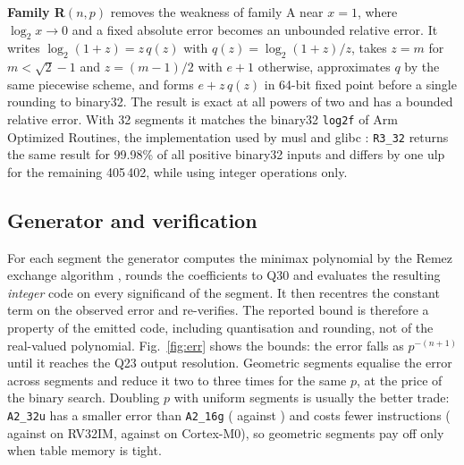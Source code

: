 \documentclass[preprint,12pt]{elsarticle}
\begin{document}
\textbf{Family R$(n,p)$} removes the weakness of family A near $x=1$, where
$\log_2 x \to 0$ and a fixed absolute error becomes an unbounded relative
error. It writes $\log_2(1+z) = z\,q(z)$ with $q(z)=\log_2(1+z)/z$, takes
$z=m$ for $m<\sqrt2-1$ and $z=(m-1)/2$ with $e+1$ otherwise, approximates
$q$ by the same piecewise scheme, and forms $e+z\,q(z)$ in 64-bit fixed point
before a single rounding to binary32. The result is exact at all powers of two
and has a bounded relative error. With 32 segments it matches the binary32
\texttt{log2f} of Arm Optimized Routines, the implementation used by musl and
glibc \cite{aor}: \texttt{R3\_32} returns the same result for 99.98\% of all
positive binary32 inputs and differs by one ulp for the remaining 405\,402,
while using integer operations only.

\subsection{Generator and verification}

For each segment the generator computes the minimax polynomial by the Remez
exchange algorithm \cite{muller2016}, rounds the coefficients to Q30 and
evaluates the resulting \emph{integer} code on every significand of the
segment. It then recentres the constant term on the observed error and
re-verifies. The reported bound is therefore a property of the emitted code,
including quantisation and rounding, not of the real-valued polynomial.
Fig.~\ref{fig:err} shows the bounds: the error falls as $p^{-(n+1)}$ until it
reaches the Q23 output resolution. Geometric segments equalise the error
across segments and reduce it two to three times for the same $p$, at the
price of the binary search. Doubling $p$ with uniform segments is usually the
better trade: \texttt{A2\_32u} has a smaller error than \texttt{A2\_16g}
(\numeAtwou{} against \numeAsixg) and costs fewer instructions
(\numiAtwou{} against \numiAsixg{} on RV32IM, \nummAtwou{} against \nummAsixg{} on
Cortex-M0), so geometric segments pay off only when table memory is tight.
\end{document}
